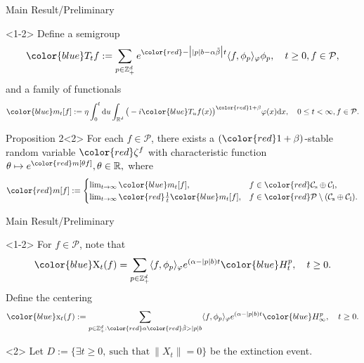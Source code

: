 \documentclass[xcolor=dvipsnames]{beamer}
\begin{document}
\begin{frame}{Main Result/Preliminary}
\begin{block}{}<1-2>
Define a semigroup
\begin{align*}
{\color{blue}T_t} f
:= \sum_{p \in \mathbb Z_+^d} e^{\color{red}-\big| |p|b - \alpha \tilde \beta \big|t} \langle f, \phi_p \rangle_{\varphi} \phi_p
,\quad t\geq 0, f\in \mathcal P,
\end{align*}
and a family of functionals
$$
{\color{blue}m_t}[f]
:= \eta \int_0^t \mathrm du \int_{\mathbb R^d} \big(-i {\color{blue}T_u} f(x)\big)^{{\color{red}1+\beta}} \varphi(x) \mathrm dx
, \quad 0 \leq t< \infty, f\in \mathcal P.
$$
\end{block}
\begin{block}{Proposition 2}<2>   
For each $f\in \mathcal P$, there exists a $({\color{red}1+\beta})$-{\color{PineGreen}stable random variable} ${\color{red}\zeta^f}$ with characteristic function
$
\theta \mapsto e^{\color{red}m[\theta f]}, \theta \in \mathbb R,
$
where
$$
{\color{red}m[f]}
:= \begin{cases}
\lim_{t\to \infty} {\color{blue}m_t}[f], &
f \in {\color{red}\mathcal C_\mathrm s \oplus \mathcal C_\mathrm l}, \\
\lim_{t\to \infty} {\color{red}\frac{1}{t}} {\color{blue}m_t}[f], & f\in {\color{red}\mathcal P \setminus (\mathcal C_\mathrm s \oplus \mathcal C_\mathrm l)}.
\end{cases}
$$
\end{block}
\end{frame}

\begin{frame}{Main Result/Preliminary}
\begin{block}{}<1-2>
For $f\in \mathcal P$, note that
	$$
	{\color{blue}\mathrm X_t(f)} = \sum_{p\in \mathbb Z^d_+}\langle f,\phi_p\rangle_\varphi e^{(\alpha-|p|b)t}{\color{blue}H^p_{t}}, \quad t\ge 0.
	$$ 
Define the centering 
$$
{\color{blue}\mathrm x_t(f)} : = \sum_{p\in \mathbb Z^d_+:{\color{red}\alpha} {\color{red}\tilde \beta>|p|b}}\langle f,\phi_p\rangle_\varphi e^{(\alpha-|p|b)t}{\color{blue}H^p_{\infty}}, \quad t\ge 0.
$$ 
\end{block}
\begin{block}{}<2>
	Let $D :=\{\exists t\geq 0,~\text{such that}~ \|X_t\| =0 \}$
	be the {\color{PineGreen}extinction event}. 
\end{block}
\end{frame}
\end{document}
